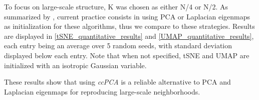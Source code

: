 To focus on large-scale structure, K was chosen as either N/4 or N/2. As summarized by \citep{kobak2021initialization}, current practice consists in using PCA or Laplacian eigenmaps as initialization for these algorithms, thus we compare to these strategies. Results are displayed in \cref{tSNE_quantitative_results} and \cref{UMAP_quantitative_results}, each entry being an average over 5 random seeds, with standard deviation displayed below each entry. Note that when not specified, tSNE and UMAP are initialized with an isotropic Gaussian variable. 

These results show that using \textit{ccPCA} is a reliable alternative to PCA and Laplacian eigenmaps for reproducing large-scale neighborhoods.

\vspace{2cm}

